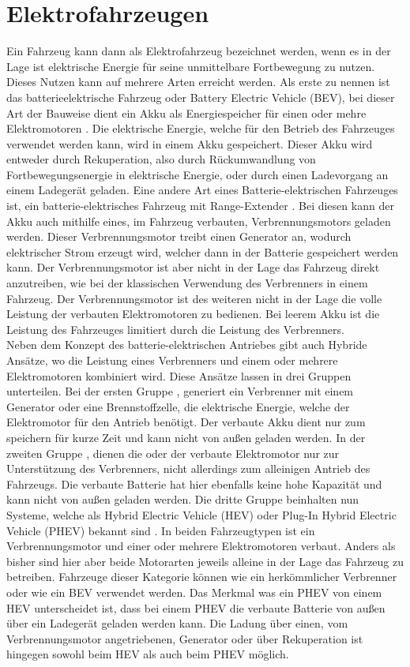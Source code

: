 \section{Elektrofahrzeugen}
Ein Fahrzeug kann dann als Elektrofahrzeug bezeichnet werden, wenn es in der Lage ist elektrische Energie für seine unmittelbare Fortbewegung zu nutzen. Dieses Nutzen kann auf mehrere Arten erreicht werden. Als erste zu nennen ist das batterieelektrische Fahrzeug oder Battery Electric Vehicle (BEV), bei dieser Art der Bauweise dient ein Akku als Energiespeicher für einen oder mehre Elektromotoren \cite{e_auto}. Die elektrische Energie, welche für den Betrieb des Fahrzeuges verwendet werden kann,  wird in einem Akku gespeichert. Dieser Akku wird entweder durch Rekuperation, also durch Rückumwandlung von Fortbewegungsenergie in elektrische Energie, oder durch einen Ladevorgang an einem Ladegerät geladen. Eine andere Art eines Batterie-elektrischen Fahrzeuges ist, ein batterie-elektrisches Fahrzeug mit Range-Extender \cite{e_auto}. Bei diesen kann der Akku auch mithilfe eines, im Fahrzeug verbauten, Verbrennungsmotors geladen werden. Dieser Verbrennungsmotor treibt einen Generator an, wodurch elektrischer Strom erzeugt wird, welcher dann in der Batterie gespeichert werden kann. Der Verbrennungsmotor ist aber nicht in der Lage das Fahrzeug direkt anzutreiben, wie bei der klassischen Verwendung des Verbrenners in einem Fahrzeug. Der Verbrennungsmotor ist des weiteren nicht in der Lage die volle Leistung der verbauten Elektromotoren zu bedienen. Bei leerem Akku ist die Leistung des Fahrzeuges limitiert durch die Leistung des Verbrenners. \\
Neben dem Konzept des batterie-elektrischen Antriebes gibt auch Hybride Ansätze, wo die Leistung eines Verbrenners und einem oder mehrere Elektromotoren kombiniert wird. Diese Ansätze lassen in drei Gruppen unterteilen. Bei der ersten Gruppe \cite{e_auto}, generiert ein Verbrenner mit einem Generator oder eine Brennstoffzelle, die elektrische Energie, welche der Elektromotor für den Antrieb benötigt. Der verbaute Akku dient nur zum speichern für kurze Zeit und kann nicht von außen geladen werden. In der zweiten Gruppe \cite{e_auto}, dienen die oder der verbaute Elektromotor nur zur Unterstützung des Verbrenners, nicht allerdings zum alleinigen Antrieb des Fahrzeugs. Die verbaute Batterie hat hier ebenfalls keine hohe Kapazität und kann nicht von außen geladen werden. Die dritte Gruppe beinhalten nun Systeme, welche als Hybrid Electric Vehicle (HEV) oder Plug-In Hybrid Electric Vehicle (PHEV) bekannt sind \cite{e_auto}. In beiden Fahrzeugtypen ist ein Verbrennungsmotor und einer oder mehrere Elektromotoren verbaut. Anders als bisher sind hier aber beide Motorarten jeweils alleine in der Lage das Fahrzeug zu betreiben. Fahrzeuge dieser Kategorie können wie ein herkömmlicher Verbrenner oder wie ein BEV verwendet werden. Das Merkmal was ein PHEV von einem HEV unterscheidet ist, dass bei einem PHEV die verbaute Batterie von außen über ein Ladegerät geladen werden kann. Die Ladung über einen, vom Verbrennungsmotor angetriebenen, Generator oder über Rekuperation ist hingegen sowohl beim HEV als auch beim PHEV möglich.\\
